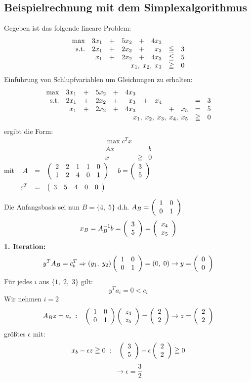 \subsection{Beispielrechnung mit dem Simplexalgorithmus}

Gegeben ist das folgende lineare Problem:
\[
\begin{array}{rrcrcrcl}
\max&3x_{1}&+&5x_{2}&+&4x_{3}\\
\mbox{s.t.}&2x_{1}&+&2x_{2}&+&x_{3} &\leqq& 3\\
&x_{1}&+&2x_{2}&+&4x_{3}&\leqq&5\\
&\multicolumn{5}{r}{x_{1},\; x_{2}, \; x_{3}}&\geqq&0
\end{array}
\]
Einführung von Schlupfvariablen um Gleichungen zu erhalten:
\[
\begin{array}{rrcrcrcrcrcl}
\max&3x_{1}&+&5x_{2}&+&4x_{3}\\
\mbox{s.t.}&2x_{1}&+&2x_{2}&+&x_{3}&+&x_{4}&&&=& 3\\
&x_{1}&+&2x_{2}&+&4x_{3}&&&+&x_{5}&=&5\\
&\multicolumn{9}{r}{x_{1},\; x_{2}, \; x_{3},\; x_{4},\; x_{5}}&\geqq&0
\end{array}
\]
ergibt die Form:
\[\begin{array}{rcl}
\max c^{T}x\\
A x&=&b\\
x &\geqq& 0
\end{array}\]
mit $\begin{array}[t]{rcl}A &=& \mat{rrrrr}{2&2&1&1&0\\1&2&4&0&1} \hspace{4mm}
b=\vect{3\\5}\vspace{2mm}\\
c^{T}&=&\mat{rrrrr}{3&5&4&0&0}
\end{array}$

Die Anfangsbasis sei nun $B = \{4,\;5\}$ d.h. $A_{B} = \mat{rr}{1&0\\0&1}$
\[x_{B} = A_{B}^{-1}b=\vect{3\\5}=\vect{x_{4}\\x_{5}}\] 
{\bf 1. Iteration:}\\
\[y^{T}A_{B} = c_{b}^{T} \Rightarrow (y_{1}, \; y_{2}) \mat{rr}{1&0\\0&1} = 
(0, \; 0) \rightarrow y = \vect{0\\0}\]
Für jedes $i$ aus $\{1, \; 2,\; 3\}$ gilt:
\[ y^{T}a_{i} = 0 < c_{i}\]
Wir nehmen $i=2$
\[A_{B} z = a_{i} \; :\hspace{3mm} \mat{rr}{1&0\\0&1} \vect{z_{4}\\z_{5}} =
\vect{2\\2} \rightarrow z = \vect{2\\2}\]
größtes $\epsilon$ mit:
\[x_{b} - \epsilon z \geqq 0  \; :\hspace{3mm} \vect{3\\5} - \epsilon
\vect{2\\2} \geqq 0\]
\[\rightarrow \epsilon = \frac{3}{2}\]

